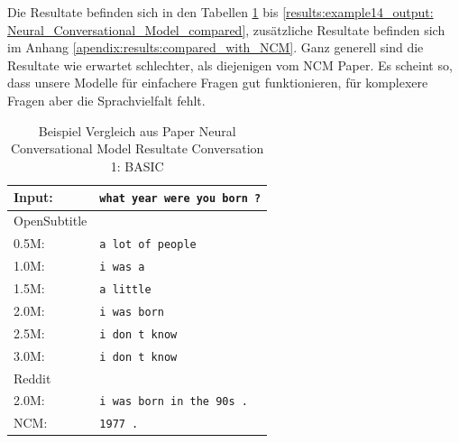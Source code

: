 Die Resultate befinden sich in den Tabellen \ref{results:example8_output: Neural_Conversational_Model_compared} bis \ref{results:example14_output: Neural_Conversational_Model_compared}, zusätzliche Resultate befinden sich im Anhang \ref{apendix:results:compared_with_NCM}. Ganz generell sind die Resultate wie erwartet schlechter, als diejenigen vom NCM Paper. Es scheint so, dass unsere Modelle für einfachere Fragen gut funktionieren, für komplexere Fragen aber die Sprachvielfalt fehlt. 
\begin{table}[H]
	\centering
	\begin{adjustbox}{max width=\textwidth}
		\begin{tabular}{ll}
			\toprule
			Input: 	& \texttt{what year were you born ?}\\
			\midrule
			OpenSubtitle\\
			0.5M: 	& \texttt{a lot of people}\\
			1.0M: 	& \texttt{i was a}\\
			1.5M:	& \texttt{a little}\\
			2.0M:	& \texttt{i was born}\\
			2.5M:	& \texttt{i don t know}\\
			3.0M:	& \texttt{i don t know}\\
			\midrule
			Reddit\\
			2.0M:	& \texttt{i was born in the 90s .}\\
			\midrule
			NCM:	& \texttt{1977 .}\\
			\bottomrule
		\end{tabular}
	\end{adjustbox}
	\caption{Beispiel Vergleich aus Paper Neural Conversational Model Resultate Conversation 1: BASIC }
	\label{results:example8_output: Neural_Conversational_Model_compared}
\end{table}

